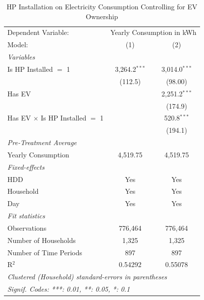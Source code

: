
\begin{table}[htbp]
   \caption{\label{tab:hp-did-ev} HP Installation on Electricity Consumption Controlling for EV Ownership}
   \centering
   \begin{tabular}{lcc}
      \tabularnewline \midrule \midrule
      Dependent Variable: & \multicolumn{2}{c}{Yearly Consumption in kWh}\\
      Model:                                 & (1)             & (2)\\  
      \midrule
      \emph{Variables}\\
      Is HP Installed $=$ 1                  & 3,264.2$^{***}$ & 3,014.0$^{***}$\\   
                                             & (112.5)         & (98.00)\\   
      Has EV                                 &                 & 2,251.2$^{***}$\\   
                                             &                 & (174.9)\\   
      Has EV $\times$ Is HP Installed $=$ 1  &                 & 520.8$^{***}$\\   
                                             &                 & (194.1)\\   
      \midrule
\emph{Pre-Treatment Average}\\
      Yearly Consumption                     & 4,519.75        & 4,519.75\\  
\midrule
      \emph{Fixed-effects}\\
      HDD                                    & Yes             & Yes\\  
      Household                              & Yes             & Yes\\  
      Day                                    & Yes             & Yes\\  
      \midrule
      \emph{Fit statistics}\\
      Observations                           & 776,464         & 776,464\\  
      Number of Households         & 1,325           & 1,325\\  
      Number of Time Periods                 & 897             & 897\\  
      R$^2$                                  & 0.54292         & 0.55078\\  
      \midrule \midrule
      \multicolumn{3}{l}{\emph{Clustered (Household) standard-errors in parentheses}}\\
      \multicolumn{3}{l}{\emph{Signif. Codes: ***: 0.01, **: 0.05, *: 0.1}}\\
   \end{tabular}
\end{table}


